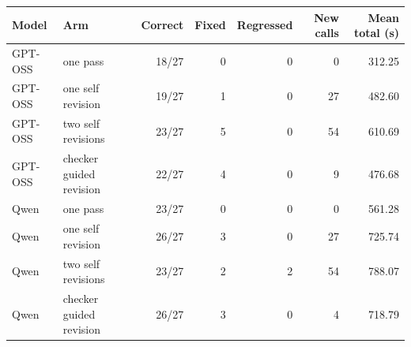 \begin{tabular}{llrrrrr}
\toprule
Model & Arm & Correct & Fixed & Regressed & New calls & Mean total (s)\\
\midrule
GPT-OSS & one pass & 18/27 & 0 & 0 & 0 & 312.25\\
GPT-OSS & one self revision & 19/27 & 1 & 0 & 27 & 482.60\\
GPT-OSS & two self revisions & 23/27 & 5 & 0 & 54 & 610.69\\
GPT-OSS & checker guided revision & 22/27 & 4 & 0 & 9 & 476.68\\
Qwen & one pass & 23/27 & 0 & 0 & 0 & 561.28\\
Qwen & one self revision & 26/27 & 3 & 0 & 27 & 725.74\\
Qwen & two self revisions & 23/27 & 2 & 2 & 54 & 788.07\\
Qwen & checker guided revision & 26/27 & 3 & 0 & 4 & 718.79\\
\bottomrule
\end{tabular}
